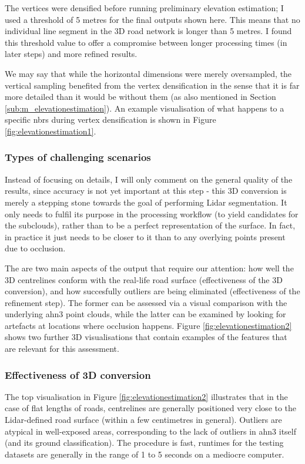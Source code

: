 The vertices were densified before running preliminary elevation estimation; I used a threshold of 5 metres for the final outputs shown here. This means that no individual line segment in the 3D road network is longer than 5 metres. I found this threshold value to offer a compromise between longer processing times (in later steps) and more refined results.

We may say that while the horizontal dimensions were merely oversampled, the vertical sampling benefited from the vertex densification in the sense that it is far more detailed than it would be without them (as also mentioned in Section \ref{sub:m_elevationestimation}). An example visualisation of what happens to a specific \ac{nbrs} during vertex densification is shown in Figure \ref{fig:elevationestimation1}.

\subsubsection{Types of challenging scenarios}

Instead of focusing on details, I will only comment on the general quality of the results, since accuracy is not yet important at this step - this 3D conversion is merely a stepping stone towards the goal of performing Lidar segmentation. It only needs to fulfil its purpose in the processing workflow (to yield candidates for the subclouds), rather than to be a perfect representation of the surface. In fact, in practice it just needs to be closer to it than to any overlying points present due to occlusion.

The are two main aspects of the output that require our attention: how well the 3D centrelines conform with the real-life road surface (effectiveness of the 3D conversion), and how succesfully outliers are being eliminated (effectiveness of the refinement step). The former can be assessed via a visual comparison with the underlying \ac{ahn3} point clouds, while the latter can be examined by looking for artefacts at locations where occlusion happens. Figure \ref{fig:elevationestimation2} shows two further 3D visualisations that contain examples of the features that are relevant for this assessment.

\subsubsection{Effectiveness of 3D conversion}

The top visualisation in Figure \ref{fig:elevationestimation2} illustrates that in the case of flat lengths of roads, centrelines are generally positioned very close to the Lidar-defined road surface (within a few centimetres in general). Outliers are atypical in well-exposed areas, corresponding to the lack of outliers in \ac{ahn3} itself (and its ground classification). The procedure is fast, runtimes for the testing datasets are generally in the range of 1 to 5 seconds on a mediocre computer.

